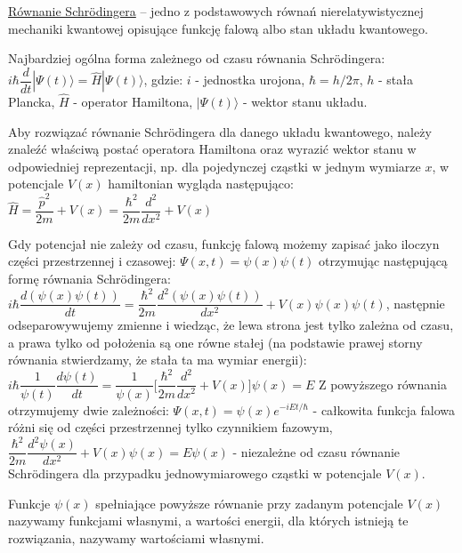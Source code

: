 \underline{Równanie Schrödingera} – jedno z podstawowych równań nierelatywistycznej mechaniki kwantowej opisujące funkcję falową albo stan układu kwantowego.

Najbardziej ogólna forma zależnego od czasu równania Schrödingera:\newline
$ i\hbar\dfrac{d}{dt}|\Psi(t) \rangle = \hat{H}|\Psi(t) \rangle $, gdzie:\newline
$ i $ - jednostka urojona, \newline
$ \hbar = h/2\pi $, $ h $ - stała Plancka, \newline
$ \hat{H} $ - operator Hamiltona, \newline
$ |\Psi(t) \rangle $ - wektor stanu układu.

Aby rozwiązać równanie Schrödingera dla danego układu kwantowego, należy znaleźć właściwą postać operatora Hamiltona oraz wyrazić wektor stanu w odpowiedniej reprezentacji, np. dla pojedynczej cząstki w jednym wymiarze $ x $, w potencjale $ V(x) $ hamiltonian wygląda następująco:\newline
$ \hat{H} = \dfrac{\hat{p}^2}{2m} + V(x) = \dfrac{\hbar^2}{2m}\dfrac{d^2}{dx^2} + V(x) $

Gdy potencjał nie zależy od czasu, funkcję falową możemy zapisać jako iloczyn części przestrzennej i czasowej:\newline
$ \Psi(x,t) = \psi(x)\psi(t) $ otrzymując następującą formę równania Schrödingera:\newline
$ i\hbar\dfrac{ d(\psi(x)\psi(t))}{dt} = \dfrac{\hbar^2}{2m}\dfrac{d^2(\psi(x)\psi(t))}{dx^2} + V(x)\psi(x)\psi(t) $, następnie odseparowywujemy zmienne i wiedząc, że lewa strona jest tylko zależna od czasu, a prawa tylko od położenia są one równe stałej (na podstawie prawej storny równania stwierdzamy, że stała ta ma wymiar energii):\newline
$ i\hbar\dfrac{1}{\psi(t)}\dfrac{ d\psi(t)}{dt} = \dfrac{1}{\psi(x)}\Big[\dfrac{\hbar^2}{2m}\dfrac{d^2}{dx^2} + V(x)\Big]\psi(x) = E $\newline
Z powyższego równania otrzymujemy dwie zależności:\newline
$ \Psi(x,t) = \psi(x)e^{-iEt/\hbar} $ -  całkowita funkcja falowa różni się od części przestrzennej tylko czynnikiem fazowym,\newline
$ \dfrac{\hbar^2}{2m}\dfrac{d^2\psi(x)}{dx^2} + V(x)\psi(x) = E\psi(x) $ - niezależne od czasu równanie Schrödingera dla przypadku jednowymiarowego cząstki w potencjale $ V(x) $. 

Funkcje $ \psi(x) $ spełniające powyższe równanie przy zadanym potencjale $ V(x) $ nazywamy funkcjami
własnymi, a wartości energii, dla których istnieją te rozwiązania, nazywamy wartościami własnymi.

